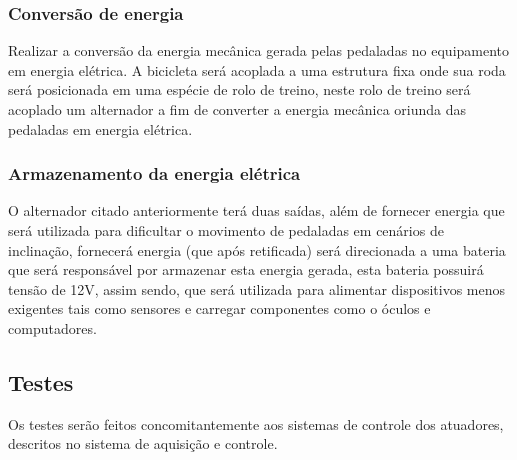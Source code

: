 \subsubsection{Conversão de energia}Realizar a conversão da energia mecânica gerada pelas pedaladas no equipamento em energia elétrica. A bicicleta será acoplada a uma estrutura fixa onde sua roda será posicionada em uma espécie de rolo de treino, neste rolo de treino será acoplado um alternador a fim de converter a energia mecânica oriunda das pedaladas em energia elétrica.

\subsubsection{Armazenamento da energia elétrica} O alternador citado anteriormente terá duas saídas, além de fornecer energia que será utilizada para dificultar o movimento de pedaladas em cenários de inclinação, fornecerá energia (que após retificada) será direcionada a uma bateria que será responsável por armazenar esta energia gerada, esta bateria possuirá tensão de 12V, assim sendo, que será utilizada para alimentar dispositivos menos exigentes tais como sensores e carregar componentes como o óculos e computadores.

\subsection{Testes}
Os testes serão feitos concomitantemente aos sistemas de controle dos atuadores, descritos no sistema de aquisição e controle.
